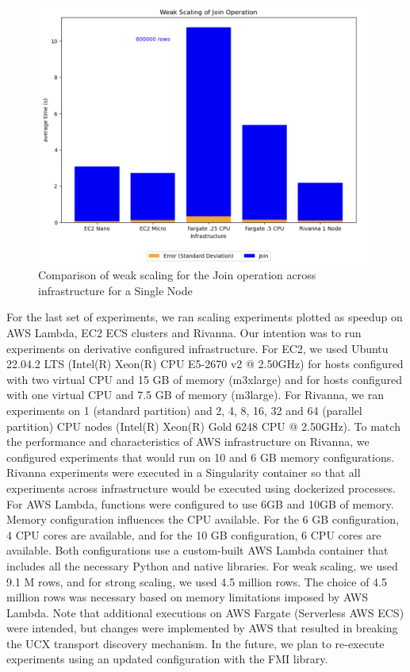 \begin{figure}[ht]
    \begin{center}
    \includegraphics[width=\linewidth]{source/Figure/singleNodeExp.png}
    \end{center}
    \caption{Comparison of weak scaling for the Join operation across infrastructure for a Single Node}
    \label{fig:singlenode}
\end{figure}

For the last set of experiments, we ran scaling experiments plotted as speedup on AWS Lambda, EC2 ECS clusters and Rivanna.  Our intention was to run experiments on derivative configured infrastructure.  For EC2,  we used Ubuntu 22.04.2 LTS (Intel(R) Xeon(R) CPU E5-2670 v2 @ 2.50GHz) for hosts configured with two virtual CPU and 15 GB of memory (m3xlarge) and for hosts configured with one virtual CPU and 7.5 GB of memory (m3large).  For Rivanna, we ran experiments on 1 (standard partition) and 2, 4, 8, 16, 32 and 64 (parallel partition) CPU nodes (Intel(R) Xeon(R) Gold 6248 CPU @ 2.50GHz).  To match the performance and characteristics of AWS infrastructure on Rivanna, we configured experiments that would run on 10 and 6 GB memory configurations.  Rivanna experiments were executed in a Singularity container so that all experiments across infrastructure would be executed using dockerized processes.  For AWS Lambda, functions were configured to use 6GB and 10GB of memory.  Memory configuration influences the CPU available.  For the 6 GB configuration, 4 CPU cores are available, and for the 10 GB configuration, 6 CPU cores are available.  Both configurations use a custom-built AWS Lambda container that includes all the necessary Python and native libraries.  For weak scaling, we used 9.1 M rows, and for strong scaling, we used 4.5 million rows.  The choice of 4.5 million rows was necessary based on memory limitations imposed by AWS Lambda.  Note that additional executions on AWS Fargate (Serverless AWS ECS)  were intended, but changes were implemented by AWS that resulted in breaking the UCX transport discovery mechanism.  In the future, we plan to re-execute experiments using an updated configuration with the FMI library.

